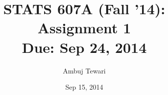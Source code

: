 \usepackage{fullpage}
\usepackage{amsmath,amssymb,amsthm}
\usepackage{url}
\usepackage[colorlinks=true]{hyperref}

\newcommand\reals{\mathbb{R}}

\author{Ambuj Tewari}
\title{STATS 607A (Fall '14): Assignment 1\\
Due: Sep 24, 2014}
\date{Sep 15, 2014}
